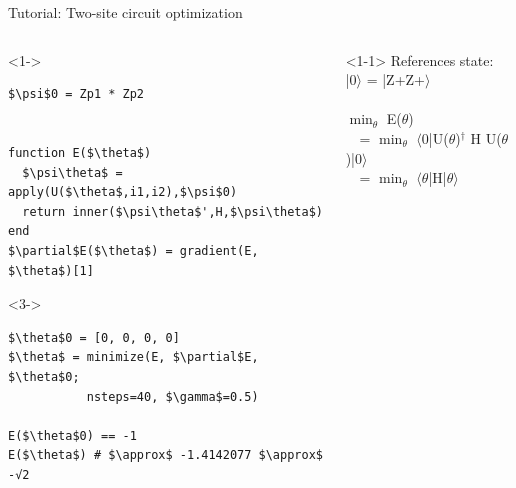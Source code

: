 \begin{frame}[fragile]{Tutorial: Two-site circuit optimization}

\begin{columns}

\begin{column}{5cm}

\begin{onlyenv}<1->
\begin{lstlisting}[language=JuliaLocal, style=julia, mathescape, basicstyle=\scriptsize\ttfamily]
$\psi$0 = Zp1 * Zp2


function E($\theta$)
  $\psi\theta$ = apply(U($\theta$,i1,i2),$\psi$0)
  return inner($\psi\theta$',H,$\psi\theta$)
end
$\partial$E($\theta$) = gradient(E, $\theta$)[1]
\end{lstlisting}
\end{onlyenv}

\begin{onlyenv}<3->
\begin{lstlisting}[language=JuliaLocal, style=julia, mathescape, basicstyle=\scriptsize\ttfamily]
$\theta$0 = [0, 0, 0, 0]
$\theta$ = minimize(E, $\partial$E, $\theta$0;
           nsteps=40, $\gamma$=0.5)

E($\theta$0) == -1
E($\theta$) # $\approx$ -1.4142077 $\approx$ -√2
\end{lstlisting}
\end{onlyenv}

\end{column}

\begin{column}{5cm}

\begin{onlyenv}<1-1>
References state: \\
|0$\rangle$ = |Z+Z+$\rangle$ \\
~\\
$\min_{\theta}$ E($\theta$)\\
\ \ = $\min_{\theta}$ $\langle$0|U($\theta$)$^\dagger$ H U($\theta$)|0$\rangle$ \\
\ \ = $\min_{\theta}$ $\langle\theta$|H|$\theta\rangle$ \\
\end{onlyenv}


\end{column}
\end{columns}
\end{frame}
